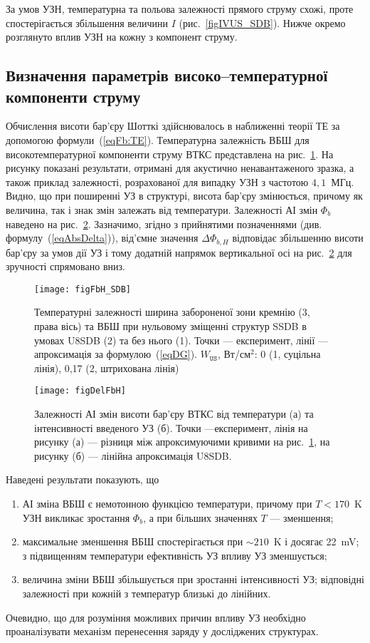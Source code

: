 За умов УЗН, температурна та польова залежності прямого струму схожі,
проте спостерігається збільшення величини $I$ (рис.~\ref{figIVUS_SDB}).
Нижче окремо розглянуто вплив УЗН на кожну з компонент струму.


\subsection{Визначення параметрів високо--температурної компоненти струму}

Обчислення висоти бар'єру Шотткі здійснювалось в наближенні теорії ТЕ за допомогою формули~(\ref{eqFb:TE}).
Температурна залежність ВБШ для високотемпературної компоненти струму ВТКС представлена на рис.~\ref{figFbH_SDB}.
На рисунку показані результати, отримані для акустично ненавантаженого зразка,
а також приклад залежності, розрахованої для випадку УЗН з частотою $4,1$~МГц.
Видно, що при поширенні УЗ в структурі, висота бар'єру змінюється,
причому як величина, так і знак змін залежать від температури.
Залежності АІ змін $\Phi_{b}$ наведено на рис.~\ref{figDelFbH}.
Зазначимо, згідно з прийнятими позначеннями (див. формулу~(\ref{eqAbsDelta})),
від'ємне значення $\Delta \Phi_{b,H}$ відповідає збільшенню висоти бар'єру за умов дії УЗ і тому
додатній напрямок вертикальної осі на рис.~\ref{figDelFbH} для зручності спрямовано вниз.



\begin{figure}
\center
\texttt{[image: figFbH\_SDB]}
\caption{\label{figFbH_SDB}
Температурні залежності ширина забороненої зони кремнію (3, права вісь)
та ВБШ при нульовому зміщенні структур SSDB в умовах U8SDB (2) та без нього (1).
Точки --- експеримент,
лінії --- апроксимація за формулою~(\ref{eqDG}).
$W_\mathtt{US}$,  Вт/см$^2$: 0 (1, суцільна лінія), 0,17 (2, штрихована лінія)
}%
\end{figure}


\begin{figure}
\center
\texttt{[image: figDelFbH]}
\caption{\label{figDelFbH}
Залежності АІ змін висоти бар'єру ВТКС від температури (а) та інтенсивності введеного УЗ (б).
Точки ---експеримент,
лінія на рисунку (а) --- різниця між апроксимуючими кривими на рис.~\ref{figFbH_SDB},
на рисунку (б) --- лінійна апроксимація
U8SDB.
}%
\end{figure}

Наведені результати показують, що
\begin{enumerate}[label=\asbuk*),leftmargin=0em,itemindent=1.5em]
\item АІ зміна ВБШ є немотонною функцією температури, причому при $T<170$~K УЗН викликає зростання $\Phi_b$,
а при більших значеннях $T$ --- зменшення;
\item максимальне зменшення ВБШ спостерігається при $\sim210$~K і досягає 22~mV;
з підвищенням температури ефективність УЗ впливу УЗ зменшується;
\item величина зміни ВБШ збільшується при зростанні інтенсивності УЗ; відповідні залежності при кожній з температур
близькі до лінійних.
\end{enumerate}
Очевидно, що для розуміння можливих причин впливу УЗ необхідно проаналізувати механізм перенесення заряду
у досліджених структурах.

